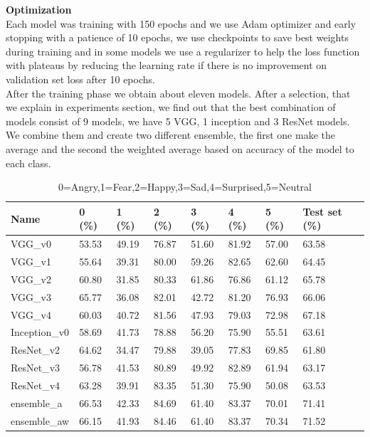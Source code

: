 \documentclass[10pt,twocolumn,letterpaper]{article}
\begin{document}
{\bf Optimization}
\\Each model was training with 150 epochs and we use Adam optimizer and early stopping with a patience of 10 epochs, we use checkpoints to save best weights during training and in some models we use a regularizer to help the loss function with plateaus by reducing the learning rate if there is no improvement on validation set loss after 10 epochs. 
\\After the training phase we obtain about eleven models. After a selection, that we explain in experiments section, we find out that the best combination of models consist of 9 models, we have 5 VGG, 1 inception and 3 ResNet models. We combine them and create two different ensemble, the first one make the average and the second the weighted average based on accuracy of the model to each class.

\def\arraystretch{1.2}
\begin{table}[H]
   \scriptsize
   \begin{tabular}{L{1.1cm}C{0.5cm}C{0.5cm}C{0.5cm}C{0.5cm}C{0.5cm}C{0.5cm}C{0.8cm}}
      \hline
      Name          & 0 (\%) & 1 (\%) & 2 (\%) & 3 (\%) & 4 (\%) & 5 (\%) & Test set (\%) \\
      \hline\hline
      VGG\_v0       & 53.53  & 49.19  & 76.87  & 51.60  & 81.92  & 57.00  & 63.58         \\
      VGG\_v1       & 55.64  & 39.31  & 80.00  & 59.26  & 82.65  & 62.60  & 64.45         \\
      VGG\_v2       & 60.80  & 31.85  & 80.33  & 61.86  & 76.86  & 61.12  & 65.78         \\
      VGG\_v3       & 65.77  & 36.08  & 82.01  & 42.72  & 81.20  & 76.93  & 66.06         \\
      VGG\_v4       & 60.03  & 40.72  & 81.56  & 47.93  & 79.03  & 72.98  & 67.18         \\
      Inception\_v0 & 58.69  & 41.73  & 78.88  & 56.20  & 75.90  & 55.51  & 63.61         \\
      ResNet\_v2    & 64.62  & 34.47  & 79.88  & 39.05  & 77.83  & 69.85  & 61.80         \\
      ResNet\_v3    & 56.78  & 41.53  & 80.89  & 49.92  & 82.89  & 61.94  & 63.17         \\
      ResNet\_v4    & 63.28  & 39.91  & 83.35  & 51.30  & 75.90  & 50.08  & 63.53         \\
      ensemble\_a    & 66.53 & 42.33 & 84.69 & 61.40 & 83.37 & 70.01 & 71.41\\
      ensemble\_aw   & 66.15 & 41.93 & 84.46 & 61.40 & 83.37 & 70.34 & 71.52\\

      \hline
   \end{tabular}
   \caption{ 0=Angry,1=Fear,2=Happy,3=Sad,4=Surprised,5=Neutral}
\end{table}
\end{document}

